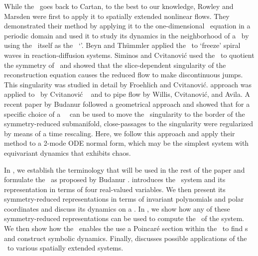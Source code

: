 While the \mslices\ goes back to Cartan, to the
best to our knowledge, Rowley and Marsden
were first to apply it to spatially extended nonlinear flows. 
They demonstrated their method by applying it to the one-dimensional \KS\ equation
in a periodic domain and used it to study its dynamics in the neighborhood of 
a \reqv\ by using the \reqv\ itself as the \slice\ `\template'.  
Beyn and Th\"{u}mmler applied the \mslices\ to `freeze' spiral
waves in reaction-diffusion systems.
Siminos and Cvitanovi\'{c} used the \mslices\ to quotient the  symmetry of
\cLf\ and showed that the slice-dependent
singularity of the reconstruction equation causes the reduced flow to make
discontinuous jumps. This singularity was studied in detail by 
Froehlich and Cvitanovi\'{c}.
approach was applied to \cLf\
by Cvitanovi\'{c} \etal~ and to pipe flow by Willis, Cvitanovi\'{c}, and Avila. 
A
recent paper by Budanur \etal{} followed a geometrical approach
and showed that for \SOn{2} a specific choice of a \slice\
\template\ can be used to move the \slice\ singularity to the border of the
symmetry-reduced submanifold, \ESedit{while} close-passages to the
singularity were regularized by means of a time rescaling. Here, we follow this approach
and apply their method to a 2-mode ODE normal form, which may be
the simplest system with \SOn{2} equivariant dynamics
that exhibits chaos.

In , we establish the terminology that will be used in the rest
of the paper and formulate the \mslices\ as proposed by Budanur \etal{}.
\refSect{s:twoMode} introduces the \twoMode\ system and its representation
in terms of four real-valued variables. We then present its symmetry-reduced representations
in terms of invariant polynomials and polar coordinates and discuss its dynamics on a \slice. 
In \refSect{s:numerics}, we show how any of these symmetry-reduced representations can be used
to compute the \reqva\ of the system. We then show how the \mslices\ enables the use a Poincar\'e section within the \slice\ to find  \rpo s and construct symbolic dynamics. Finally,  discusses possible applications of the \mslices\ to various spatially extended systems.

